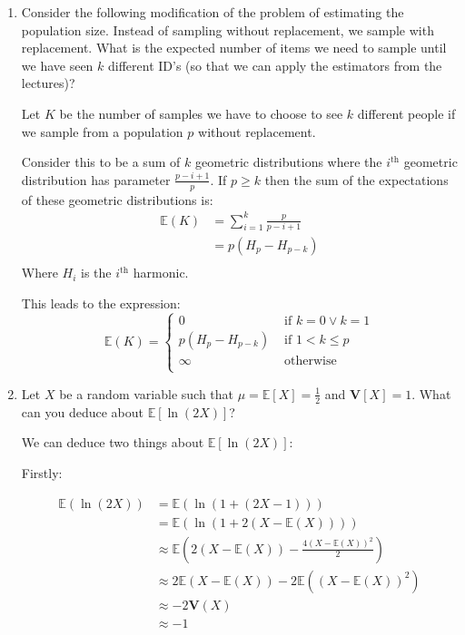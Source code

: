 \documentclass[10pt,\jkfside,a4paper]{article}
\begin{document}
\begin{enumerate}
\begin{enumerate}
\end{enumerate}

\setcounter{enumi}{8}

\item Consider the following modification of the problem of estimating the population size. 
Instead of sampling without replacement, we sample with replacement. 
What is the expected number of items we need to sample until we have seen $k$ different ID's (so that we can apply the 
estimators from the lectures)?

Let $K$ be the number of samples we have to choose to see $k$ different people if we sample from a
population $p$ without replacement.

Consider this to be a sum of $k$ geometric distributions where the $i^\text{th}$ geometric distribution has
parameter $\frac{p - i + 1}{p}$. If $p \geq k$ then the sum of the expectations of these geometric distributions is:
\[
\begin{split}
\mathbb{E}(K) &= \sum^{k}_{i=1} \frac{p}{p - i + 1} \\
&= p(H_p - H_{p - k}) \\
\end{split}
\]
Where $H_i$ is the $i^\text{th}$ harmonic.

This leads to the expression:
\[
\mathbb{E}(K) =
\begin{cases}
0 & \text{ if } k = 0 \vee k = 1\\
p(H_p - H_{p - k}) & \text{ if } 1 < k \leq p \\
\infty & \text{ otherwise } \\
\end{cases}
\]

\setcounter{enumi}{10}

\item Let $X$ be a random variable such that $\mu = \mathbb{E}[X] = \frac{1}{2}$ and $\mathbf{V}\left[ X \right] = 1$. 
What can you deduce about $\mathbb{E}[\ln(2X)]$?

We can deduce two things about $\mathbb{E}[\ln(2X)]$:

Firstly:

\[
\begin{split}
\mathbb{E}(\ln(2X)) &= \mathbb{E}(\ln(1 + (2X - 1))) \\
&= \mathbb{E}(\ln(1 + 2(X - \mathbb{E}(X)))) \\
&\approx \mathbb{E}\left(2(X - \mathbb{E}(X)) - \frac{4(X - \mathbb{E}(X))^2}{2}\right) \\
&\approx 2\mathbb{E}(X - \mathbb{E}(X)) - 2\mathbb{E}((X - \mathbb{E}(X))^2) \\
&\approx -2\mathbf{V}(X) \\
&\approx -1 \\
\end{split}
\]


\end{enumerate}
\end{document}

